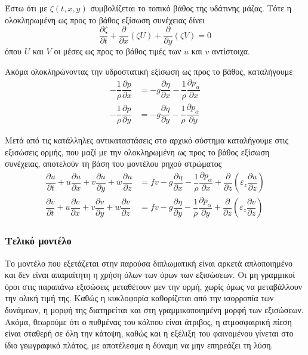 Έστω ότι με $ζ(t, x, y)$ συμβολίζεται το τοπικό βάθος της υδάτινης μάζας. Τότε η ολοκληρωμένη ως προς το βάθος εξίσωση συνέχειας δίνει
\begin{equation}
    \dfrac{\partial{ζ}}{\partial{t}} + \dfrac{\partial}{\partial{x}}\left(ζU\right) + \dfrac{\partial}{\partial{y}}\left(ζV\right) = 0 \label{eq:int-cont}
\end{equation}
όπου $U$ και $V$ οι μέσες ως προς το βάθος τιμές των $u$ και $v$ αντίστοιχα.

Ακόμα ολοκληρώνοντας την υδροστατική εξίσωση ως προς το βάθος, καταλήγουμε
\begin{align}
    -\dfrac{1}{ρ}\dfrac{\partial{p}}{\partial{x}} &= -g\dfrac{\partial{η}}{\partial{x}}-\dfrac{1}{ρ}\dfrac{\partial{p_α}}{\partial{x}} \\
    -\dfrac{1}{ρ}\dfrac{\partial{p}}{\partial{y}} &= -g\dfrac{\partial{η}}{\partial{y}}-\dfrac{1}{ρ}\dfrac{\partial{p_α}}{\partial{y}}
\end{align}

Μετά από τις κατάλληλες αντικαταστάσεις στο αρχικό σύστημα καταλήγουμε στις εξισώσεις ορμής, που μαζί με την ολοκληρωμένη ως προς το βάθος εξίσωση συνέχειας, αποτελούν τη βάση του μοντέλου ρηχού στρώματος
\begin{align}
    \dfrac{\partial{u}}{\partial{t}} + u\dfrac{\partial{u}}{\partial{x}} + v\dfrac{\partial{u}}{\partial{y}} + w\dfrac{\partial{u}}{\partial{z}} &= fv-g\dfrac{\partial{η}}{\partial{x}}-\dfrac{1}{ρ}\dfrac{\partial{p_α}}{\partial{x}} + \dfrac{\partial}{\partial{z}}\left(ε_z\dfrac{\partial{u}}{\partial{z}}\right) \label{eq:u-mom-non}\\
    \dfrac{\partial{v}}{\partial{t}} + u\dfrac{\partial{v}}{\partial{x}} + v\dfrac{\partial{v}}{\partial{y}} + w\dfrac{\partial{v}}{\partial{z}} &= fv-g\dfrac{\partial{η}}{\partial{y}}-\dfrac{1}{ρ}\dfrac{\partial{p_α}}{\partial{y}} + \dfrac{\partial}{\partial{z}}\left(ε_z\dfrac{\partial{v}}{\partial{z}}\right) \label{eq:v-mom-non}
\end{align}

\subsubsection{Τελικό μοντέλο}
Το μοντέλο που εξετάζεται στην παρούσα διπλωματική είναι αρκετά απλοποιημένο και δεν είναι απαραίτητη η χρήση όλων των όρων των εξισώσεων. Οι μη γραμμικοί όροι στις παραπάνω εξισώσεις μεταθέτουν μεν την ορμή, χωρίς όμως να μεταβάλλουν την ολική τιμή της. Καθώς η κυκλοφορία καθορίζεται από την ισορροπία των δυνάμεων, η μορφή της διατηρείται και στη γραμμικοποιημένη μορφή των εξισώσεων. Ακόμα, θεωρούμε ότι ο πυθμένας του κόλπου είναι άτριβος, η ατμοσφαιρική πίεση είναι σταθερή σε όλη την κάτοψη, καθώς και η εξέλιξη του φαινομένου γίνεται στο ίδιο γεωγραφικό πλάτος, με αποτέλεσμα η δύναμη \cor να μην επηρεάζει τη λύση.

